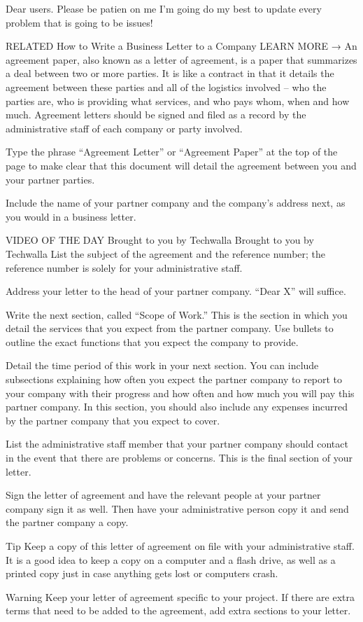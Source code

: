 Dear users.
Please be patien on me I'm going do my best to update every problem that is going to be issues!

RELATED
How to Write a Business Letter to a Company
LEARN MORE →
An agreement paper, also known as a letter of agreement, is a paper that summarizes a deal between two or more parties. It is like a contract in that it details the agreement between these parties and all of the logistics involved -- who the parties are, who is providing what services, and who pays whom, when and how much. Agreement letters should be signed and filed as a record by the administrative staff of each company or party involved.


 
Type the phrase “Agreement Letter” or “Agreement Paper” at the top of the page to make clear that this document will detail the agreement between you and your partner parties.

Include the name of your partner company and the company’s address next, as you would in a business letter.

VIDEO OF THE DAY
Brought to you by Techwalla
Brought to you by Techwalla
List the subject of the agreement and the reference number; the reference number is solely for your administrative staff.

Address your letter to the head of your partner company. “Dear X” will suffice.

Write the next section, called “Scope of Work.” This is the section in which you detail the services that you expect from the partner company. Use bullets to outline the exact functions that you expect the company to provide.

Detail the time period of this work in your next section. You can include subsections explaining how often you expect the partner company to report to your company with their progress and how often and how much you will pay this partner company. In this section, you should also include any expenses incurred by the partner company that you expect to cover.

List the administrative staff member that your partner company should contact in the event that there are problems or concerns. This is the final section of your letter.

Sign the letter of agreement and have the relevant people at your partner company sign it as well. Then have your administrative person copy it and send the partner company a copy.

Tip
Keep a copy of this letter of agreement on file with your administrative staff. It is a good idea to keep a copy on a computer and a flash drive, as well as a printed copy just in case anything gets lost or computers crash.

Warning
Keep your letter of agreement specific to your project. If there are extra terms that need to be added to the agreement, add extra sections to your letter.

